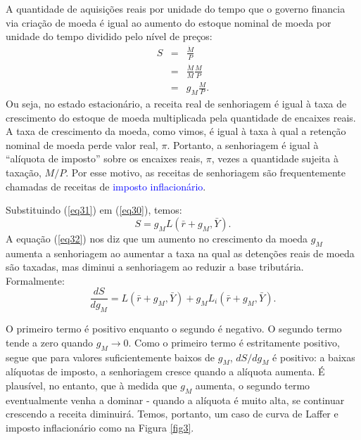 \documentclass[preprintnumbers,nofootinbib,amsmath,amssymb,12pt]{article}
\begin{document}
A quantidade de aquisições reais por unidade do tempo que o governo financia via criação de moeda é igual ao aumento do estoque nominal de moeda por unidade do tempo dividido pelo nível de preços:
\begin{eqnarray}
S &=& \frac{\dot{M}}{P} \nonumber \\
&=& \frac{\dot{M}}{M}\frac{M}{P} \nonumber \\
&=& g_M \frac{M}{P}. \label{eq31}
\end{eqnarray}
Ou seja, no estado estacionário, a receita real de senhoriagem é igual à taxa de crescimento do estoque de moeda multiplicada pela quantidade de encaixes reais. A taxa de crescimento da moeda, como vimos, é igual à taxa à qual a retenção nominal de moeda perde valor real, $\pi$. Portanto, a senhoriagem é igual à ``alíquota de imposto'' sobre os encaixes reais, $\pi$, vezes a quantidade sujeita à taxação, $M/P$. Por esse motivo, as receitas de senhoriagem são frequentemente chamadas de receitas de \textcolor{blue}{imposto inflacionário}.

Substituindo (\ref{eq31}) em (\ref{eq30}), temos:
\begin{equation}
    S = g_M L(\bar{r} + g_M, \bar{Y}).
    \label{eq32}
\end{equation}
A equação (\ref{eq32}) nos diz que um aumento no crescimento da moeda $g_M$ aumenta a senhoriagem ao aumentar a taxa na qual as detenções reais de moeda são taxadas, mas diminui a senhoriagem ao reduzir a base tributária. Formalmente:
\begin{equation}
    \frac{dS}{dg_M} = L(\bar{r} + g_M, \bar{Y}) + g_ML_i(\bar{r} + g_M, \bar{Y}).
\end{equation}

O primeiro termo é positivo enquanto o segundo é negativo. O segundo termo tende a zero quando $g_M \to 0$. Como o primeiro termo é estritamente positivo, segue que para valores suficientemente baixos de $g_M$, $dS/dg_M$ é positivo: a baixas alíquotas de imposto, a senhoriagem cresce quando a alíquota aumenta. É plausível, no entanto, que à medida que $g_M$ aumenta, o segundo termo eventualmente venha a dominar - quando a alíquota é muito alta, se continuar crescendo a receita diminuirá. Temos, portanto, um caso de curva de Laffer e imposto inflacionário como na Figura \ref{fig3}.
\end{document}
